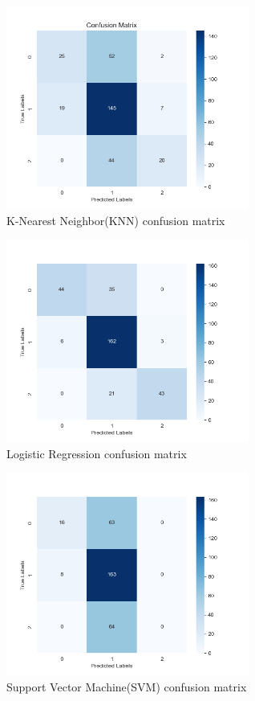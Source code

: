 \documentclass[conference]{IEEEtran}
\begin{document}
\begin{figure}[H]
    \centering
    \includegraphics[width=8cm]{fig9.png}
    \caption{K-Nearest Neighbor(KNN) confusion matrix}
    \label{fig:9}
\end{figure}

\begin{figure}[H]
    \centering
    \includegraphics[width=8cm]{fig10.png}
    \caption{Logistic Regression confusion matrix}
    \label{fig:10}
\end{figure}

\begin{figure}[H]
    \centering
    \includegraphics[width=8cm]{fig11.png}
    \caption{Support Vector Machine(SVM) confusion matrix}
    \label{fig:11}
\end{figure}
\end{document}
